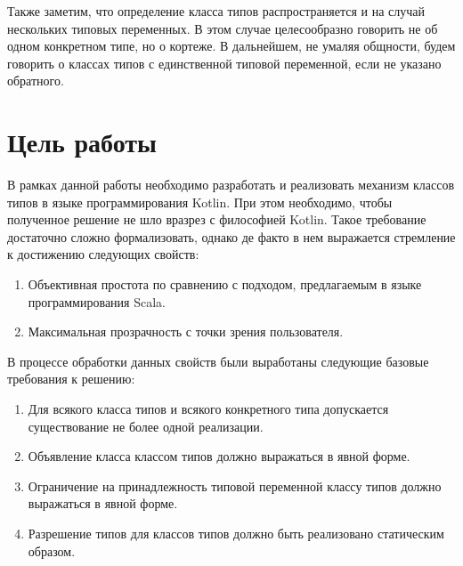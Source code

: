 Также заметим, что определение класса типов распространяется и на случай нескольких типовых переменных. В этом случае целесообразно говорить не об одном конкретном типе, но о кортеже. В дальнейшем, не умаляя общности, будем говорить о классах типов с единственной типовой переменной, если не указано обратного.


\section{Цель работы \label{sct:problem-constraints}}

В рамках данной работы необходимо разработать и реализовать механизм классов типов в языке программирования Kotlin. При этом необходимо, чтобы полученное решение не шло вразрез с философией Kotlin. Такое требование достаточно сложно формализовать, однако де факто в нем выражается стремление к достижению следующих свойств:
\begin{enumerate}
    \item \label{it:rp-01} Объективная простота по сравнению с подходом, предлагаемым в языке программирования Scala.
    \item \label{it:rp-02} Максимальная прозрачность с точки зрения пользователя.
\end{enumerate} 
В процессе обработки данных свойств были выработаны следующие базовые требования к решению: 
\begin{enumerate}
    \item Для всякого класса типов и всякого конкретного типа допускается существование не более одной реализации.
    \item Объявление класса классом типов должно выражаться в явной форме.
    \item Ограничение на принадлежность типовой переменной классу типов должно выражаться в явной форме.
    \item Разрешение типов для классов типов должно быть реализовано статическим образом. 
\end{enumerate}

